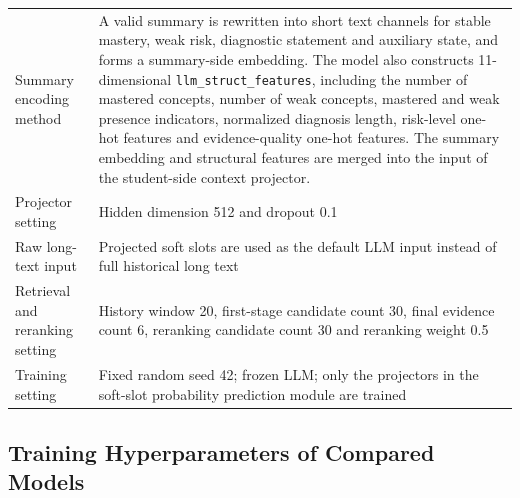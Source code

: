 \documentclass[a4paper,12pt]{article}
\numberwithin{table}{section}
\begin{document}
\begin{table}[htbp]
\begin{tabularx}{\textwidth}{p{3.8cm}X}
Summary encoding method & A valid summary is rewritten into short text channels for stable mastery, weak risk, diagnostic statement and auxiliary state, and forms a summary-side embedding. The model also constructs 11-dimensional \texttt{llm\_struct\_features}, including the number of mastered concepts, number of weak concepts, mastered and weak presence indicators, normalized diagnosis length, risk-level one-hot features and evidence-quality one-hot features. The summary embedding and structural features are merged into the input of the student-side context projector. \\
Projector setting & Hidden dimension 512 and dropout 0.1 \\
Raw long-text input & Projected soft slots are used as the default LLM input instead of full historical long text \\
Retrieval and reranking setting & History window 20, first-stage candidate count 30, final evidence count 6, reranking candidate count 30 and reranking weight 0.5 \\
Training setting & Fixed random seed 42; frozen LLM; only the projectors in the soft-slot probability prediction module are trained \\
\bottomrule
\end{tabularx}
\end{table}

\subsection{Training Hyperparameters of Compared Models}
\end{document}
